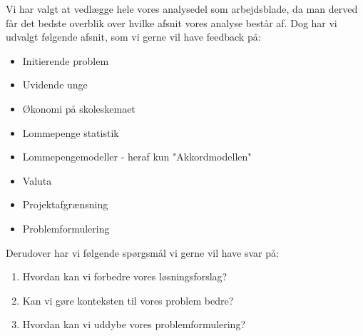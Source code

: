 Vi har valgt at vedlægge hele vores analysedel som arbejdsblade, da man derved får det bedste overblik over hvilke afsnit vores analyse består af. Dog har vi udvalgt følgende afsnit, som vi gerne vil have feedback på:

\begin{itemize}
\item Initierende problem
\item Uvidende unge
\item Økonomi på skoleskemaet
\item Lommepenge statistik
\item Lommepengemodeller - heraf kun "Akkordmodellen"
\item Valuta
\item Projektafgrænsning
\item Problemformulering \\
\end{itemize} 

\noindent  Derudover har vi følgende spørgsmål vi gerne vil have svar på:\\

\begin{enumerate}
\item Hvordan kan vi forbedre vores løsningsforslag?
\item Kan vi gøre konteksten til vores problem bedre?
\item Hvordan kan vi uddybe vores problemformulering?
\end{enumerate}
